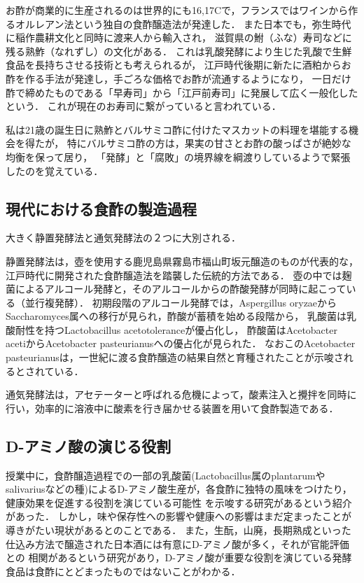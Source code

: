 \documentclass[uplatex, dvipdfmx]{jsarticle}
\begin{document}
お酢が商業的に生産されるのは世界的にも16,17Cで，フランスではワインから作るオルレアン法という独自の食酢醸造法が発達した．
また日本でも，弥生時代に稲作農耕文化と同時に渡来人から輸入され，
滋賀県の鮒（ふな）寿司などに残る熟鮓（なれずし）の文化がある．
これは乳酸発酵により生じた乳酸で生鮮食品を長持ちさせる技術とも考えられるが，
江戸時代後期に新たに酒粕からお酢を作る手法が発達し，手ごろな価格でお酢が流通するようになり，
一日だけ酢で締めたものである「早寿司」から「江戸前寿司」に発展して広く一般化したという\cite{バイオよもやま話}．
これが現在のお寿司に繋がっていると言われている．

私は21歳の誕生日に熟鮓とバルサミコ酢に付けたマスカットの料理を堪能する機会を得たが，
特にバルサミコ酢の方は，果実の甘さとお酢の酸っぱさが絶妙な均衡を保って居り，
「発酵」と「腐敗」の境界線を綱渡りしているようで緊張したのを覚えている．

\subsection{現代における食酢の製造過程}\label{section-食酢製造}

大きく静置発酵法と通気発酵法の２つに大別される．

静置発酵法は，壺を使用する鹿児島県霧島市福山町坂元醸造のものが代表的な，
江戸時代に開発された食酢醸造法を踏襲した伝統的方法である．
壺の中では麹菌によるアルコール発酵と，そのアルコールからの酢酸発酵が同時に起こっている（並行複発酵）．
初期段階のアルコール発酵では，Aspergillus oryzaeからSaccharomyces属への移行が見られ，酢酸が蓄積を始める段階から，
乳酸菌は乳酸耐性を持つLactobacillus acetotoleranceが優占化し，
酢酸菌はAcetobacter acetiからAcetobacter pasteurianusへの優占化が見られた\cite{Haruta}．
なおこのAcetobacter pasteurianusは，一世紀に渡る食酢醸造の結果自然と育種されたことが示唆されるとされている\cite{Nanda}．

通気発酵法は，アセテーターと呼ばれる危機によって，酸素注入と攪拌を同時に行い，効率的に溶液中に酸素を行き届かせる装置を用いて食酢製造である．

\subsection{D-アミノ酸の演じる役割}

授業中に，食酢醸造過程での一部の乳酸菌(Lactobacillus属のplantarumやsalivariusなどの種)によるD-アミノ酸生産が，各食酢に独特の風味をつけたり，健康効果を促進する役割を演じている可能性
を示唆する研究があるという紹介があった．
しかし，味や保存性への影響や健康への影響はまだ定まったことが導きがたい現状があるとのことである\cite{解説}．
また，生酛，山廃，長期熟成といった仕込み方法で醸造された日本酒には有意にD-アミノ酸が多く，それが官能評価との
相関があるという研究があり，D-アミノ酸が重要な役割を演じている発酵食品は食酢にとどまったものではないことがわかる\cite{Oikawa}．
\end{document}
